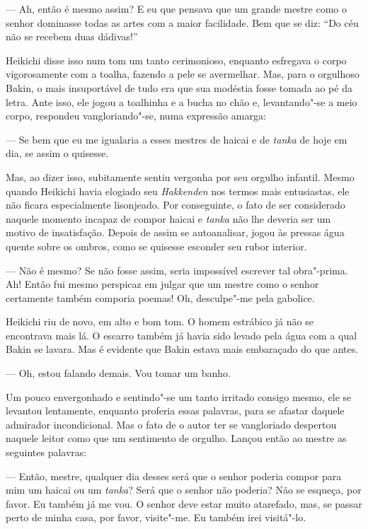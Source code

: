 --- Ah, então é mesmo assim? E eu que pensava que um grande mestre como o 
senhor dominasse todas as artes com a maior facilidade. Bem que se diz:
``Do céu não se recebem duas dádivas!''

Heikichi disse isso num tom um tanto cerimonioso, enquanto esfregava o
corpo vigorosamente com a toalha, fazendo a pele se avermelhar. Mas,
para o orgulhoso Bakin, o mais insuportável de tudo era que sua modéstia
fosse tomada ao pé da letra. Ante isso, ele jogou a toalhinha e a bucha
no chão e, levantando"-se a meio corpo, respondeu vangloriando"-se, 
numa expressão amarga:

--- Se bem que eu me igualaria a esses mestres de haicai e de
\textit{tanka} de hoje em dia, se assim o quisesse.

Mas, ao dizer isso, subitamente sentiu vergonha por seu orgulho
infantil. Mesmo quando Heikichi havia elogiado seu \textit{Hakkenden}
nos termos mais entusiastas, ele não ficara especialmente lisonjeado.
Por conseguinte, o fato de ser considerado naquele momento incapaz de
compor haicai e \textit{tanka} não lhe deveria ser um motivo de
insatisfação. Depois de assim se autoanalisar, jogou às pressas água
quente sobre os ombros, como se quisesse esconder seu rubor interior.

--- Não é mesmo? Se não fosse assim, seria impossível escrever tal
obra"-prima. Ah! Então fui mesmo perspicaz em julgar que um mestre
como o senhor certamente também comporia poemas! Oh, desculpe"-me pela gabolice.

Heikichi riu de novo, em alto e bom tom. O homem estrábico já não se
encontrava mais lá. O escarro também já havia sido levado pela água com
a qual Bakin se lavara. Mas é evidente que Bakin estava mais embaraçado
do que antes.

--- Oh, estou falando demais. Vou tomar um banho.

Um pouco envergonhado e sentindo"-se um tanto irritado consigo mesmo, ele
se levantou lentamente, enquanto proferia essas palavras, para se
afastar daquele admirador incondicional. Mas o fato de o autor ter se
vangloriado despertou naquele leitor como que um sentimento de orgulho.
Lançou então ao mestre as seguintes palavras:

--- Então, mestre, qualquer dia desses será que o senhor poderia compor
para mim um haicai ou um \textit{tanka}? Será que o senhor não poderia?
Não se esqueça, por favor. Eu também já me vou. O senhor deve estar
muito atarefado, mas, se passar perto de minha casa, por favor,
visite"-me. Eu também irei visitá"-lo.

